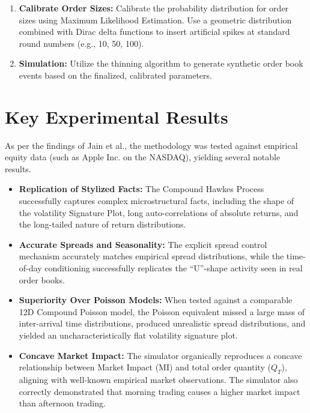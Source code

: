 \begin{enumerate}
    \item \textbf{Calibrate Order Sizes:} Calibrate the probability distribution for order sizes using Maximum Likelihood Estimation. Use a geometric distribution combined with Dirac delta functions to insert artificial spikes at standard round numbers (e.g., 10, 50, 100).
    \item \textbf{Simulation:} Utilize the thinning algorithm to generate synthetic order book events based on the finalized, calibrated parameters.
\end{enumerate}

\section{Key Experimental Results}

As per the findings of Jain et al.\cite{jain2023lobhawkes}, the methodology was tested against empirical equity data (such as Apple Inc. on the NASDAQ), yielding several notable results.

\begin{itemize}
    \item \textbf{Replication of Stylized Facts:} The Compound Hawkes Process successfully captures complex microstructural facts, including the shape of the volatility Signature Plot, long auto-correlations of absolute returns, and the long-tailed nature of return distributions.
    \item \textbf{Accurate Spreads and Seasonality:} The explicit spread control mechanism accurately matches empirical spread distributions, while the time-of-day conditioning successfully replicates the ``U''-shape activity seen in real order books.
    \item \textbf{Superiority Over Poisson Models:} When tested against a comparable 12D Compound Poisson model, the Poisson equivalent missed a large mass of inter-arrival time distributions, produced unrealistic spread distributions, and yielded an uncharacteristically flat volatility signature plot.
    \item \textbf{Concave Market Impact:} The simulator organically reproduces a concave relationship between Market Impact (MI) and total order quantity ($Q_T$), aligning with well-known empirical market observations. The simulator also correctly demonstrated that morning trading causes a higher market impact than afternoon trading.
\end{itemize}
